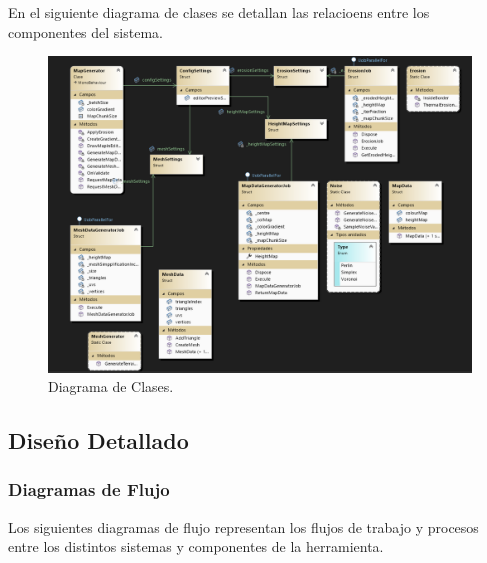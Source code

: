 En el siguiente diagrama de clases se detallan las relacioens entre los componentes del sistema.

\begin{figure}[H]
    \centering
    \includegraphics[width=1\textwidth]{img/diagrama de clases.png}
    \caption{Diagrama de Clases.}
\end{figure}


\subsection{Diseño Detallado}


\subsubsection{Diagramas de Flujo}
Los siguientes diagramas de flujo representan los flujos de trabajo y procesos entre los distintos sistemas y componentes de la herramienta.

